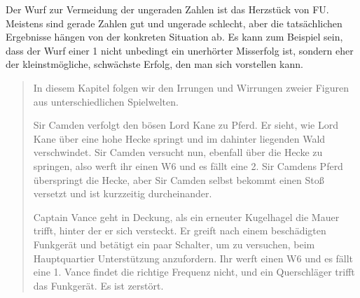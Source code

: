 \documentclass[]{article}
\begin{document}
Der Wurf zur Vermeidung der ungeraden Zahlen ist das Herzstück von FU.
Meistens sind gerade Zahlen gut und ungerade schlecht, aber die
tatsächlichen Ergebnisse hängen von der konkreten Situation ab. Es kann
zum Beispiel sein, dass der Wurf einer 1 nicht unbedingt ein unerhörter
Misserfolg ist, sondern eher der kleinstmögliche, schwächste Erfolg, den
man sich vorstellen kann.

\begin{quote}
In diesem Kapitel folgen wir den Irrungen und Wirrungen zweier Figuren
aus unterschiedlichen Spielwelten.

Sir Camden verfolgt den bösen Lord Kane zu Pferd. Er sieht, wie Lord
Kane über eine hohe Hecke springt und im dahinter liegenden Wald
verschwindet. Sir Camden versucht nun, ebenfall über die Hecke zu
springen, also werft ihr einen W6 und es fällt eine 2. Sir Camdens Pferd
überspringt die Hecke, aber Sir Camden selbst bekommt einen Stoß
versetzt und ist kurzzeitig durcheinander.

Captain Vance geht in Deckung, als ein erneuter Kugelhagel die Mauer
trifft, hinter der er sich versteckt. Er greift nach einem beschädigten
Funkgerät und betätigt ein paar Schalter, um zu versuchen, beim
Hauptquartier Unterstützung anzufordern. Ihr werft einen W6 und es fällt
eine 1. Vance findet die richtige Frequenz nicht, und ein Querschläger
trifft das Funkgerät. Es ist zerstört.
\end{quote}
\end{document}
